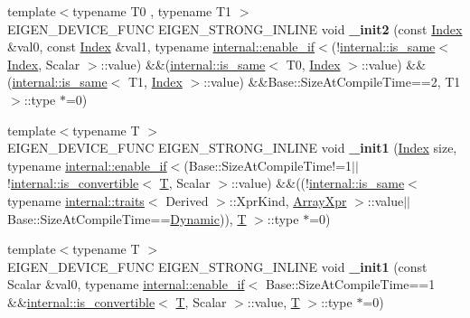 \begin{DoxyCompactItemize}
{\footnotesize template$<$typename T0 , typename T1 $>$ }\\E\+I\+G\+E\+N\+\_\+\+D\+E\+V\+I\+C\+E\+\_\+\+F\+U\+NC E\+I\+G\+E\+N\+\_\+\+S\+T\+R\+O\+N\+G\+\_\+\+I\+N\+L\+I\+NE void {\bfseries \+\_\+init2} (const \hyperlink{namespace_eigen_a62e77e0933482dafde8fe197d9a2cfde}{Index} \&val0, const \hyperlink{namespace_eigen_a62e77e0933482dafde8fe197d9a2cfde}{Index} \&val1, typename \hyperlink{struct_eigen_1_1internal_1_1enable__if}{internal\+::enable\+\_\+if}$<$(!\hyperlink{struct_eigen_1_1internal_1_1is__same}{internal\+::is\+\_\+same}$<$ \hyperlink{namespace_eigen_a62e77e0933482dafde8fe197d9a2cfde}{Index}, Scalar $>$\+::value) \&\&(\hyperlink{struct_eigen_1_1internal_1_1is__same}{internal\+::is\+\_\+same}$<$ T0, \hyperlink{namespace_eigen_a62e77e0933482dafde8fe197d9a2cfde}{Index} $>$\+::value) \&\&(\hyperlink{struct_eigen_1_1internal_1_1is__same}{internal\+::is\+\_\+same}$<$ T1, \hyperlink{namespace_eigen_a62e77e0933482dafde8fe197d9a2cfde}{Index} $>$\+::value) \&\&Base\+::\+Size\+At\+Compile\+Time==2, T1 $>$\+::type $\ast$=0)
\item 
\mbox{\label{class_eigen_1_1_plain_object_base_ae67658cea63893ac50e3809c533649ca}} 
{\footnotesize template$<$typename T $>$ }\\E\+I\+G\+E\+N\+\_\+\+D\+E\+V\+I\+C\+E\+\_\+\+F\+U\+NC E\+I\+G\+E\+N\+\_\+\+S\+T\+R\+O\+N\+G\+\_\+\+I\+N\+L\+I\+NE void {\bfseries \+\_\+init1} (\hyperlink{namespace_eigen_a62e77e0933482dafde8fe197d9a2cfde}{Index} size, typename \hyperlink{struct_eigen_1_1internal_1_1enable__if}{internal\+::enable\+\_\+if}$<$(Base\+::\+Size\+At\+Compile\+Time!=1$\vert$$\vert$!\hyperlink{struct_eigen_1_1internal_1_1is__convertible}{internal\+::is\+\_\+convertible}$<$ \hyperlink{group___sparse_core___module}{T}, Scalar $>$\+::value) \&\&((!\hyperlink{struct_eigen_1_1internal_1_1is__same}{internal\+::is\+\_\+same}$<$ typename \hyperlink{struct_eigen_1_1internal_1_1traits}{internal\+::traits}$<$ Derived $>$\+::Xpr\+Kind, \hyperlink{struct_eigen_1_1_array_xpr}{Array\+Xpr} $>$\+::value$\vert$$\vert$Base\+::\+Size\+At\+Compile\+Time==\hyperlink{namespace_eigen_ad81fa7195215a0ce30017dfac309f0b2}{Dynamic})), \hyperlink{group___sparse_core___module}{T} $>$\+::type $\ast$=0)
\item 
\mbox{\label{class_eigen_1_1_plain_object_base_aaaad53bc947ff3a17af1eedbdeb3a788}} 
{\footnotesize template$<$typename T $>$ }\\E\+I\+G\+E\+N\+\_\+\+D\+E\+V\+I\+C\+E\+\_\+\+F\+U\+NC E\+I\+G\+E\+N\+\_\+\+S\+T\+R\+O\+N\+G\+\_\+\+I\+N\+L\+I\+NE void {\bfseries \+\_\+init1} (const Scalar \&val0, typename \hyperlink{struct_eigen_1_1internal_1_1enable__if}{internal\+::enable\+\_\+if}$<$ Base\+::\+Size\+At\+Compile\+Time==1 \&\&\hyperlink{struct_eigen_1_1internal_1_1is__convertible}{internal\+::is\+\_\+convertible}$<$ \hyperlink{group___sparse_core___module}{T}, Scalar $>$\+::value, \hyperlink{group___sparse_core___module}{T} $>$\+::type $\ast$=0)

\end{DoxyCompactItemize}
